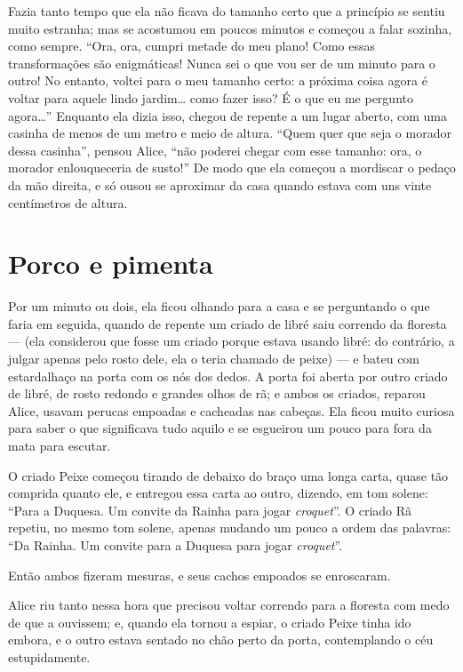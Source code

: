 Fazia tanto tempo que ela não ficava do tamanho certo que a princípio
se sentiu muito estranha; mas se acostumou em poucos minutos e começou
a falar sozinha, como sempre. ``Ora, ora, cumpri metade do meu plano!
Como essas transformações são enigmáticas! Nunca sei o que vou ser de um
minuto para o outro! No entanto, voltei para o meu tamanho certo: a
próxima coisa agora é voltar para aquele lindo jardim\ldots{} como fazer
isso? É o que eu me pergunto agora\ldots{}'' Enquanto ela dizia isso, chegou
de repente a um lugar aberto, com uma casinha de menos de um metro e
meio de altura. ``Quem quer que seja o morador dessa casinha'', pensou
Alice, ``não poderei chegar com esse tamanho: ora, o morador
enlouqueceria de susto!'' De modo que ela começou a mordiscar o pedaço
da mão direita, e só ousou se aproximar da casa quando estava com uns
vinte centímetros de altura.

\quebra\chapter{Porco e pimenta}

Por um minuto ou dois, ela ficou olhando para a casa e se perguntando o
que faria em seguida, quando de repente um criado de libré saiu correndo
da floresta --- (ela considerou que fosse um criado porque estava usando
libré: do contrário, a julgar apenas pelo rosto dele, ela o teria
chamado de peixe) --- e bateu com estardalhaço na porta com os nós dos
dedos. A porta foi aberta por outro criado de libré, de rosto redondo e
grandes olhos de rã; e ambos os criados, reparou Alice, usavam perucas
empoadas e cacheadas nas cabeças. Ela ficou muito curiosa para saber o
que significava tudo aquilo e se esgueirou um pouco para fora da mata
para escutar.

O criado Peixe começou tirando de debaixo do braço uma longa carta,
quase tão comprida quanto ele, e entregou essa carta ao outro, dizendo,
em tom solene: ``Para a Duquesa. Um convite da Rainha para jogar
\textit{croquet}''. O criado Rã repetiu, no mesmo tom solene, apenas mudando um
pouco a ordem das palavras: ``Da Rainha. Um convite para a Duquesa para
jogar \textit{croquet}''.

Então ambos fizeram mesuras, e seus cachos empoados se enroscaram.

Alice riu tanto nessa hora que precisou voltar correndo para a floresta
com medo de que a ouvissem; e, quando ela tornou a espiar, o criado
Peixe tinha ido embora, e o outro estava sentado no chão perto da porta,
contemplando o céu estupidamente.

